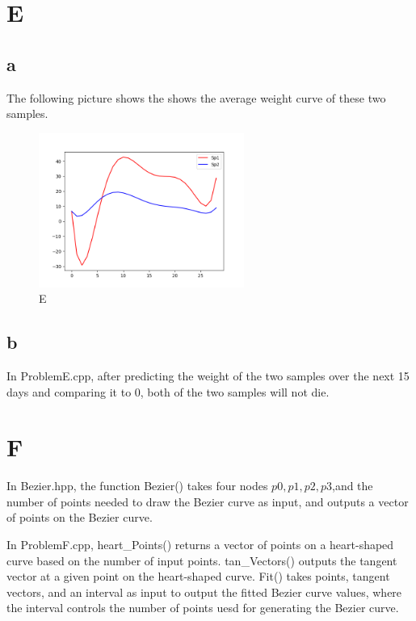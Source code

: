 \documentclass[a4paper]{article}
\begin{document}
\section{E}
\subsection*{a}
The following picture shows the shows the average weight curve of these two samples.
\begin{figure}[htbp]
  \centering
  \includegraphics[width=0.6\textwidth]{pic/E(a).png}
  \caption{E}
  \label{E}
\end{figure}
\subsection*{b}
In ProblemE.cpp, after predicting the weight of the two samples over the next 15 days and comparing it to $0$, both of the two samples will not die.

\section{F}
In Bezier.hpp, the function Bezier() takes four nodes $p0,p1,p2,p3$,and the number of points needed to draw the Bezier curve as input, and outputs a vector of points on the Bezier curve.

In ProblemF.cpp, heart{\_}Points() returns a vector of points on a heart-shaped curve based on the number of input points. tan{\_}Vectors() outputs the tangent vector at a given point on the heart-shaped curve.
 Fit() takes points, tangent vectors, and an interval as input to output the fitted Bezier curve values, where the interval controls the number of points uesd for generating the Bezier curve.
\end{document}
